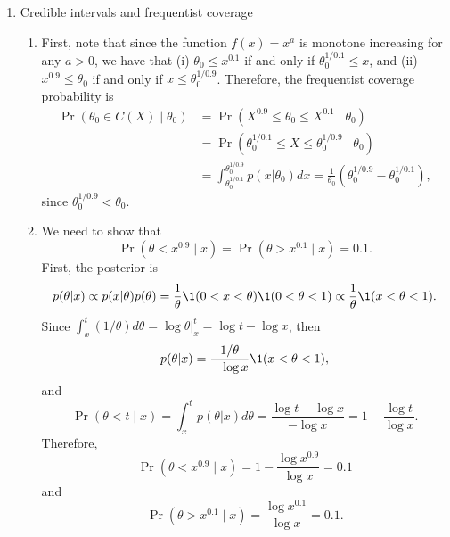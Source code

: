 \documentclass[12pt]{article}
\begin{document}
\begin{enumerate}
\item Credible intervals and frequentist coverage
\begin{enumerate}
\item First, note that since the function $f(x) =x^a$ is monotone increasing for any $a >0$, we have that (i) $\theta_0 \leq x^{0.1}$ if and only if $\theta_0^{1/0.1} \leq x$, and (ii) $x^{0.9} \leq \theta_0$ if and only if $x \leq \theta_0^{1/0.9}$. Therefore, the frequentist coverage probability is
\begin{align*}
\Pr(\theta_0 \in C(X) \mid \theta_0) &= \Pr(X^{0.9}\leq \theta_0 \leq X^{0.1} \mid \theta_0)\\
& = \Pr(\theta_0^{1/0.1} \leq X \leq \theta_0^{1/0.9} \mid \theta_0)\\
& = \int_{\theta_0^{1/0.1}}^{\theta_0^{1/0.9}} p(x | \theta_0) d  x = \frac{1}{\theta_0} (\theta_0^{1/0.9} - \theta_0^{1/0.1}),
\end{align*}
since $\theta_0^{1/0.9} <\theta_0$.
\item We need to show that
$$ \Pr(\theta <x^{ 0.9}  \mid x) = \Pr(\theta >x^{0.1} \mid x) = 0.1. $$
First, the posterior is
 \begin{align*}
 p(\theta | x)  \propto p(x | \theta) p(\theta) =
 \frac{1}{\theta} \1(0 <x <\theta) \1(0 <\theta <1)
 \propto \frac{1}{\theta} \1(x <\theta <1).
 \end{align*}
 Since $\int_x^t (1/\theta) d\theta = \log \theta|_x^t = \log t - \log x$, then
 $$ p(\theta | x) = \frac{1/\theta}{- \log x} \1(x <\theta <1),$$
 and
 $$ \Pr(\theta <t \mid x) = \int_x^t p(\theta | x)d\theta = \frac{\log t - \log x}{- \log x} = 1 - \frac{\log t}{\log x}. $$
 Therefore,
 $$ \Pr(\theta <x^{0.9} \mid x) = 1 - \frac{\log x^{0.9}}{\log x} = 0.1 $$
 and
 $$ \Pr(\theta >x^{0.1} \mid x) = \frac{\log x^{0.1}}{\log x} = 0.1. $$
\end{enumerate}






    
\end{enumerate}
\end{document}

